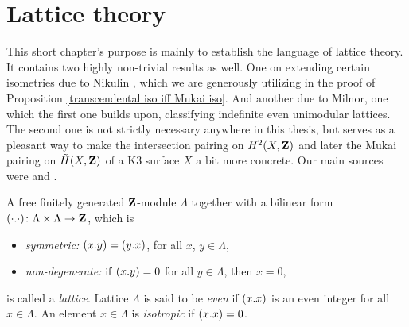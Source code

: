 \section{Lattice theory}
\label{appendix B}

This short chapter's purpose is mainly to establish the language of lattice theory. It contains two highly non-trivial results as well. One on extending certain isometries due to Nikulin \cite{Nikulin1980}, which we are generously utilizing in the proof of Proposition \ref{transcendental iso iff Mukai iso}. And another due to Milnor, one which the first one builds upon, classifying indefinite even unimodular lattices. The second one is not strictly necessary anywhere in this thesis, but serves as a pleasant way to make the intersection pairing on $H^{2}(X, \mathbf Z)$ and later the Mukai pairing on $\,\tilde{\!{H}}(X, \mathbf Z)$ of a K3 surface $X$ a bit more concrete. Our main sources were \cite[\S 14]{Huybrechts2016} and \cite{Nikulin1980}.

\begin{definition}
    A free finitely generated $\mathbf Z$-module $\Lambda$ together with a bilinear form $(\cdot.\cdot) \colon \Lambda \times \Lambda \to \mathbf Z$, which is
    \begin{itemize}
        \item \emph{symmetric:} $(x.y) = (y.x)$, for all $x$, $y \in \Lambda$,
        \item \emph{non-degenerate:} if $(x.y) = 0$ for all $y \in \Lambda$, then $x = 0$,
    \end{itemize}
    is called a \emph{lattice}. Lattice $\Lambda$ is said to be \emph{even} if $(x.x)$ is an even integer for all $x \in \Lambda$. An element $x \in \Lambda$ is \emph{isotropic} if $(x.x) = 0$.
\end{definition}

